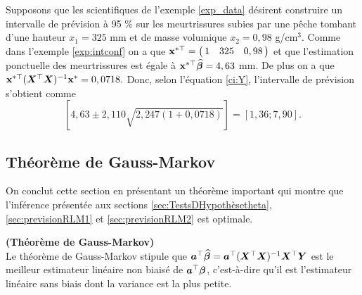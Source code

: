 \begin{exemple}
Supposons que les scientifiques de l'exemple \ref{exp_data} désirent construire un intervalle de prévision à 95 $\%$ sur les meurtrissures subies par une pêche tombant d'une hauteur  $x_1=325$ mm et de masse volumique $x_2=0,98$ g/cm$^3$. Comme dans l'exemple \ref{exp:intconf} on a que $\bold{x}^{*\top}=\left(\!\!
\begin{array}{ccc}
1 & 325 &  0,98
\end{array}
\!\!\right)$
et que l'estimation ponctuelle des meurtrissures est égale à
$\bold{x}^{*\top}\widehat{\bm\beta}=4,63$ mm. De plus on a que $\bold{x}^{*\top}(\bm{X}^\top\bm{X})^{-1}\bold{x}^*=0,0718.$ Donc, selon l'équation \eqref{ci:Y}, l'intervalle de prévision s'obtient comme
$$\left[4,63\pm 2,110\sqrt{2,247(1+0,0718)}\right]=\left[1,36;7,90\right].$$
\end{exemple}



\subsection{Théorème de Gauss-Markov}
\label{sec:ThéorèmeDeGaussMarkov}


On conclut cette section en présentant un théorème important qui montre que l'inférence présentée aux sections \ref{sec:TestsDHypothèsetheta}, \ref{sec:previsionRLM1} et \ref{sec:previsionRLM2} est optimale.

\begin{theorem}\textbf{(Théorème de Gauss-Markov)}\\
Le théorème de Gauss-Markov stipule que ${\bm{a}}^\top\widehat{\bm\beta} = {\bm{a}}^\top(\bm{X}^\top\bm{X})^{-1}\bm{X}^\top\bm{Y}$ est le meilleur estimateur linéaire non biaisé de ${\bm{a}}^\top\bm\beta$, c'est-à-dire qu'il est l'estimateur linéaire sans biais dont la variance est la plus petite.
\end{theorem}



